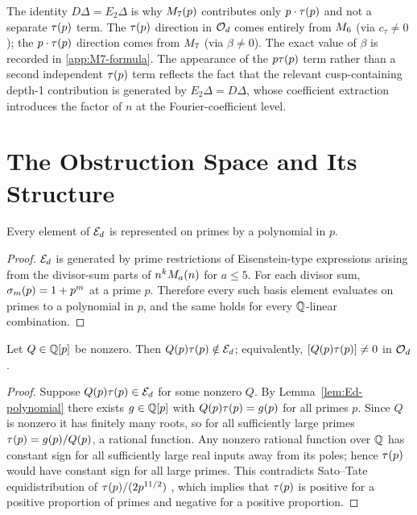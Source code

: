 \documentclass[11pt]{article}
\begin{document}
\begin{remark}
The identity $D\Delta = E_2\Delta$ is why $M_{7}(p)$ contributes only $p\cdot\tau(p)$
and not a separate $\tau(p)$ term.
The $\tau(p)$ direction in $\mathcal{O}_d$ comes entirely from $M_{6}$ (via $c_{\tau}\neq 0$);
the $p\cdot\tau(p)$ direction comes from $M_{7}$ (via $\beta\neq 0$).
The exact value of $\beta$ is recorded in \cref{app:M7-formula}.
The appearance of the $p\tau(p)$ term rather than a second independent $\tau(p)$ term
reflects the fact that the relevant cusp-containing depth-1 contribution is generated by
$E_2\Delta = D\Delta$, whose coefficient extraction introduces the factor of $n$ at the
Fourier-coefficient level.
\end{remark}

\section{The Obstruction Space and Its Structure}
\label{sec:obstruction-space}

\begin{lemma}
\label{lem:Ed-polynomial}
Every element of $\mathcal{E}_d$ is represented on primes by a polynomial in $p$.
\end{lemma}

\begin{proof}
$\mathcal{E}_d$ is generated by prime restrictions of Eisenstein-type expressions arising from
the divisor-sum parts of $n^kM_{a}(n)$ for $a\le 5$.
For each divisor sum, $\sigma_{m}(p)=1+p^m$ at a prime $p$.
Therefore every such basis element evaluates on primes to a polynomial in $p$, and the
same holds for every $\mathbb{Q}$-linear combination.
\end{proof}

\begin{lemma}
\label{lem:Qtau-not-in-Ed}
Let $Q\in\mathbb{Q}[p]$ be nonzero.
Then $Q(p)\tau(p)\notin\mathcal{E}_d$; equivalently, $[Q(p)\tau(p)]\ne 0$ in $\mathcal{O}_d$.
\end{lemma}

\begin{proof}
Suppose $Q(p)\tau(p)\in\mathcal{E}_d$ for some nonzero $Q$.
By Lemma~\ref{lem:Ed-polynomial} there exists $g\in\mathbb{Q}[p]$ with $Q(p)\tau(p)=g(p)$
for all primes $p$.
Since $Q$ is nonzero it has finitely many roots, so for all sufficiently large primes
$\tau(p)=g(p)/Q(p)$, a rational function.
Any nonzero rational function over $\mathbb{Q}$ has constant sign for all sufficiently large
real inputs away from its poles; hence $\tau(p)$ would have constant sign for all
large primes.
This contradicts Sato--Tate equidistribution of $\tau(p)/(2p^{11/2})$
\cite{BLGHT2011}, which implies that $\tau(p)$ is positive for a positive proportion
of primes and negative for a positive proportion.
\end{proof}
\end{document}
